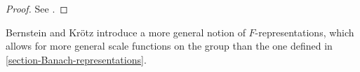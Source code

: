 \begin{proof}
See \cite[Lemma 2.10]{Bernstein-Kroetz}.
\end{proof}

\begin{remark}
\label{remark-generalscalefunctions}
 Bernstein and Kr\"otz introduce a more general notion of $F$-representations, which allows for more general scale functions on the group than the one defined in \ref{section-Banach-representations}.
\end{remark}




















